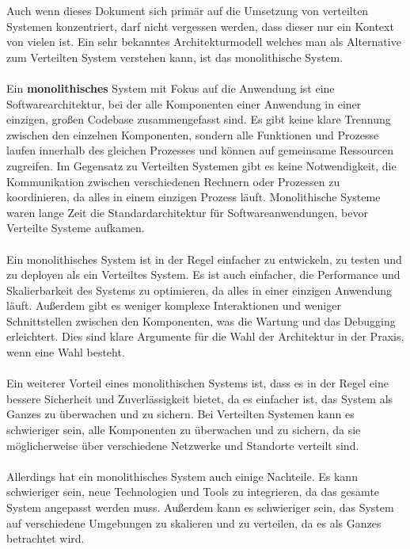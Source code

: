 \documentclass[../vs-script-first-v01.tex]{subfiles}
\begin{document}
Auch wenn dieses Dokument sich primär auf die Umsetzung von verteilten Systemen konzentriert, darf nicht vergessen werden, dass dieser nur ein Kontext von vielen ist. Ein sehr bekanntes Architekturmodell welches man als Alternative zum Verteilten System verstehen kann, ist das monolithische System\cite{Newman2015}.
\\\\
Ein \textbf{monolithisches} System mit Fokus auf die Anwendung\cite{Szyperski2002} ist eine Softwarearchitektur, bei der alle Komponenten einer Anwendung in einer einzigen, großen Codebase zusammengefasst sind. Es gibt keine klare Trennung zwischen den einzelnen Komponenten, sondern alle Funktionen und Prozesse laufen innerhalb des gleichen Prozesses und können auf gemeinsame Ressourcen zugreifen. Im Gegensatz zu Verteilten Systemen gibt es keine Notwendigkeit, die Kommunikation zwischen verschiedenen Rechnern oder Prozessen zu koordinieren, da alles in einem einzigen Prozess läuft. Monolithische Systeme waren lange Zeit die Standardarchitektur für Softwareanwendungen, bevor Verteilte Systeme aufkamen.
\\\\
Ein monolithisches System ist in der Regel einfacher zu entwickeln, zu testen und zu deployen als ein Verteiltes System. Es ist auch einfacher, die Performance und Skalierbarkeit des Systems zu optimieren, da alles in einer einzigen Anwendung läuft. Außerdem gibt es weniger komplexe Interaktionen und weniger Schnittstellen zwischen den Komponenten, was die Wartung und das Debugging erleichtert. Dies sind klare Argumente für die Wahl der Architektur in der Praxis, wenn eine Wahl besteht.
\\\\
Ein weiterer Vorteil eines monolithischen Systems ist, dass es in der Regel eine bessere Sicherheit und Zuverlässigkeit bietet, da es einfacher ist, das System als Ganzes zu überwachen und zu sichern. Bei Verteilten Systemen kann es schwieriger sein, alle Komponenten zu überwachen und zu sichern, da sie möglicherweise über verschiedene Netzwerke und Standorte verteilt sind.
\\\\
Allerdings hat ein monolithisches System auch einige Nachteile. Es kann schwieriger sein, neue Technologien und Tools zu integrieren, da das gesamte System angepasst werden muss. Außerdem kann es schwieriger sein, das System auf verschiedene Umgebungen zu skalieren und zu verteilen, da es als Ganzes betrachtet wird.
\\\\
\end{document}
